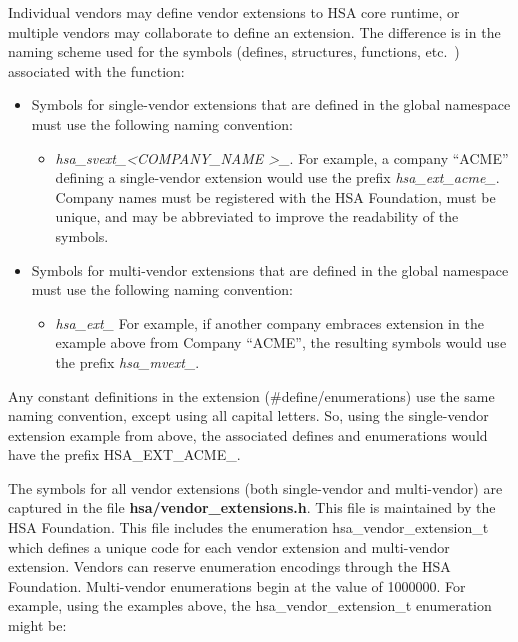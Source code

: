 \documentclass[draft]{book}
\newcommand{\reftyp}[1]{#1}
\newcommand{\refenu}[1]{\reftyp{#1}}
\begin{document}
Individual vendors may define vendor extensions to HSA core runtime, or multiple
vendors may collaborate to define an extension. The difference is in the naming
scheme used for the symbols (defines, structures, functions, etc.\ ) associated
with the function:

\begin{itemize}
\item Symbols for single-vendor extensions that are defined in the global
  namespace must use the following naming convention:
  \begin{itemize}
  \item \emph{hsa_svext_\textless COMPANY_NAME \textgreater_}. For example,
    a company ``ACME'' defining a single-vendor extension would use the prefix
    \emph{hsa_ext_acme_}. Company names must be registered with the HSA
    Foundation, must be unique, and may be abbreviated to improve the
    readability of the symbols.
  \end{itemize}
\item Symbols for multi-vendor extensions that are defined in the global
  namespace must use the following naming convention:
  \begin{itemize}
  \item \emph{hsa_ext_} For example, if another company embraces extension in
    the example above from Company ``ACME'', the resulting symbols would use the
    prefix \emph{hsa_mvext_}.
  \end{itemize}
\end{itemize}

Any constant definitions in the extension (\#define/enumerations) use the same
naming convention, except using all capital letters. So, using the single-vendor
extension example from above, the associated defines and enumerations would have
the prefix \refenu{HSA_EXT_ACME_}.

The symbols for all vendor extensions (both single-vendor and multi-vendor) are
captured in the file {\bf hsa/vendor_extensions.h}. This file is maintained by
the HSA Foundation. This file includes the enumeration
\reftyp{hsa_vendor_extension_t} which defines a unique code for each vendor
extension and multi-vendor extension. Vendors can reserve enumeration encodings
through the HSA Foundation. Multi-vendor enumerations begin at the value of
1000000. For example, using the examples above, the
\reftyp{hsa_vendor_extension_t} enumeration might be:


\end{document}
